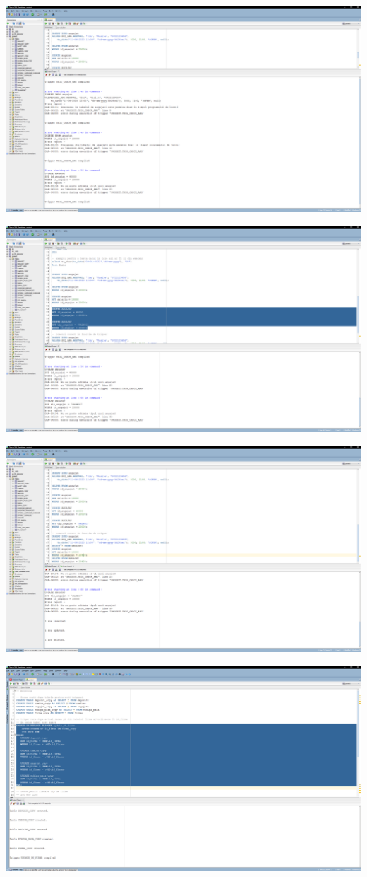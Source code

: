 \documentclass[12pt, a4paper]{article}
\begin{document}
\includegraphics[width=\textwidth]{100_1.png}

\includegraphics[width=\textwidth]{100_2.png}

\includegraphics[width=\textwidth]{100_3.png}

\includegraphics[width=\textwidth]{10_1.png}
\end{document}
